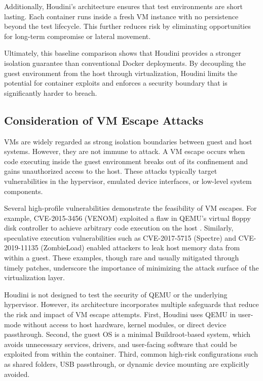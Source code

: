 \documentclass[12pt]{report}
\begin{document}
\begin{doublespace}
Additionally, Houdini’s architecture ensures that test environments are short lasting. Each container runs inside a fresh VM instance with no persistence beyond the test lifecycle. This further reduces risk by eliminating opportunities for long-term compromise or lateral movement.

Ultimately, this baseline comparison shows that Houdini provides a stronger isolation guarantee than conventional Docker deployments. By decoupling the guest environment from the host through virtualization, Houdini limits the potential for container exploits and enforces a security boundary that is significantly harder to breach.

\subsection{Consideration of VM Escape Attacks}

VMs are widely regarded as strong isolation boundaries between guest and host systems. However, they are not immune to attack. A VM escape occurs when code executing inside the guest environment breaks out of its confinement and gains unauthorized access to the host. These attacks typically target vulnerabilities in the hypervisor, emulated device interfaces, or low-level system components.

Several high-profile vulnerabilities demonstrate the feasibility of VM escapes. For example, CVE-2015-3456 (VENOM) exploited a flaw in QEMU's virtual floppy disk controller to achieve arbitrary code execution on the host \cite{venom}. Similarly, speculative execution vulnerabilities such as CVE-2017-5715 (Spectre) \cite{spectre} and CVE-2019-11135 (ZombieLoad) \cite{zombieload} enabled attackers to leak host memory data from within a guest. These examples, though rare and usually mitigated through timely patches, underscore the importance of minimizing the attack surface of the virtualization layer.

Houdini is not designed to test the security of QEMU or the underlying hypervisor. However, its architecture incorporates multiple safeguards that reduce the risk and impact of VM escape attempts. First, Houdini uses QEMU in user-mode without access to host hardware, kernel modules, or direct device passthrough. Second, the guest OS is a minimal Buildroot-based system, which avoids unnecessary services, drivers, and user-facing software that could be exploited from within the container. Third, common high-risk configurations such as shared folders, USB passthrough, or dynamic device mounting are explicitly avoided.


\end{doublespace}
\end{document}
